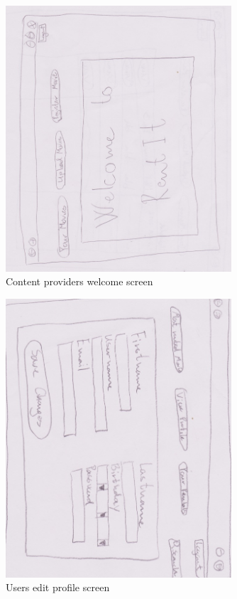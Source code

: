 \begin{figure}[!ht]
  \centering
    \includegraphics[width=0.75\textwidth]{Parts/Appendix/Images/PaperMockup/CPWelcome}
  \caption{Content providers welcome screen}
  \label{fig:Appendix_GUI_sketches_CPWelcome}
\end{figure}



\begin{figure}[!ht]
  \centering
    \includegraphics[width=0.75\textwidth]{Parts/Appendix/Images/PaperMockup/EditProfile}
  \caption{Users edit profile screen}
  \label{fig:Appendix_GUI_sketches_EditProfile}
\end{figure}

